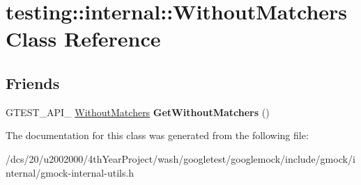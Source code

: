 \hypertarget{classtesting_1_1internal_1_1WithoutMatchers}{}\section{testing\+:\+:internal\+:\+:Without\+Matchers Class Reference}
\label{classtesting_1_1internal_1_1WithoutMatchers}
\subsection*{Friends}
\begin{DoxyCompactItemize}
\item 
\mbox{\label{classtesting_1_1internal_1_1WithoutMatchers_aec6c0de08b3c9096e2365c023664a848}} 
G\+T\+E\+S\+T\+\_\+\+A\+P\+I\+\_\+ \mbox{\hyperlink{classtesting_1_1internal_1_1WithoutMatchers}{Without\+Matchers}} {\bfseries Get\+Without\+Matchers} ()
\end{DoxyCompactItemize}


The documentation for this class was generated from the following file\+:\begin{DoxyCompactItemize}
\item 
/dcs/20/u2002000/4th\+Year\+Project/wash/googletest/googlemock/include/gmock/internal/gmock-\/internal-\/utils.\+h\end{DoxyCompactItemize}
